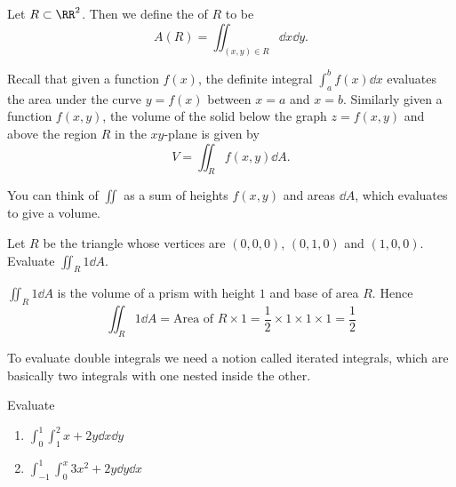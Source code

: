 \begin{definition}
Let $R\subset\RR^2$. Then we define the  of $R$ to be
\[ A(R)=\iint_{(x,y)\in R}\dd{x}\dd{y}. \]
\end{definition}


Recall that given a function $f(x)$, the definite integral $\int_a^bf(x)\dd{x}$ evaluates the area under the curve $y=f(x)$ between $x=a$ and $x=b$. Similarly given a function $f(x,y)$, the volume of the solid below the graph $z=f(x,y)$ and above the region $R$ in the $xy$-plane is given by 
\begin{equation}
V=\iint_Rf(x,y)\dd{A}.
\end{equation}

\begin{remark}
You can think of $\iint$ as a sum of heights $f(x,y)$ and areas $\dd{A}$, which evaluates to give a volume.
\end{remark}

\begin{exercise}
Let $R$ be the triangle whose vertices are $(0,0,0)$, $(0,1,0)$ and $(1,0,0)$. Evaluate $\iint_R1\dd{A}$.
\end{exercise}

\begin{solution}
$\iint_R1\dd{A}$ is the volume of a prism with height $1$ and base of area $R$. Hence
\[ \iint_R1\dd{A}=\text{Area of }R\times1=\frac{1}{2}\times1\times1\times1=\boxed{\frac{1}{2}} \]
\end{solution}

To evaluate double integrals we need a notion called iterated integrals, which are basically two integrals with one nested inside the other.

\begin{exercise}
Evaluate 
\begin{enumerate}[label=(\alph*)]
\item $\displaystyle\int_0^1\int_1^2x+2y\dd{x}\dd{y}$
\item $\displaystyle\int_{-1}^1\int_0^x3x^2+2y\dd{y}\dd{x}$
\end{enumerate}
\end{exercise}


